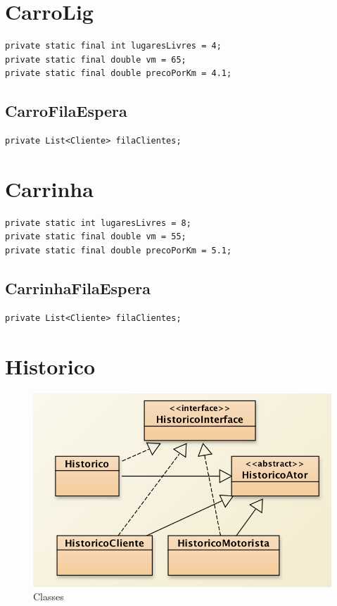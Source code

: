 \section{CarroLig}

\begin{verbatim}
private static final int lugaresLivres = 4;
private static final double vm = 65; 
private static final double precoPorKm = 4.1;
\end{verbatim}

\subsection{CarroFilaEspera}
\begin{verbatim}
private List<Cliente> filaClientes;
\end{verbatim}

\section{Carrinha}

\begin{verbatim}
private static int lugaresLivres = 8;
private static final double vm = 55;
private static final double precoPorKm = 5.1;
\end{verbatim}

\subsection{CarrinhaFilaEspera}
\begin{verbatim}
private List<Cliente> filaClientes;
\end{verbatim}

\newpage
\section{Historico}
\begin{figure}[htpb]
	\centering
	\includegraphics[scale=0.6]{imagem/historico}
	\caption{Classes }
	\label{p2:fig:p2_historico}
\end{figure}

